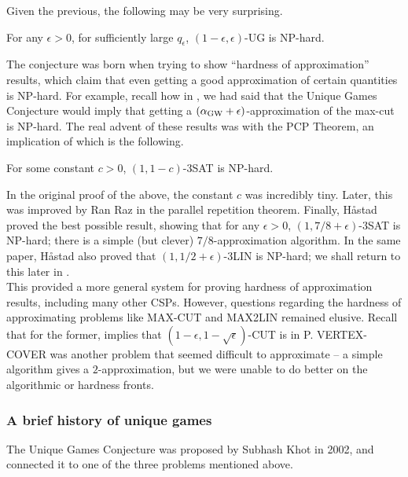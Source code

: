 		Given the previous, the following may be very surprising.
		\begin{fcon}
			For any $\epsilon > 0$, for sufficiently large $q_{\epsilon}$, $(1-\epsilon,\epsilon)$-UG is \textsf{NP}-hard.
		\end{fcon}
		The conjecture was born when trying to show ``hardness of approximation'' results, which claim that even getting a good approximation of certain quantities is \textsf{NP}-hard. For example, recall how in , we had said that the Unique Games Conjecture would imply that getting a $(\alpha_{\text{GW}}+\epsilon)$-approximation of the max-cut is \textsf{NP}-hard. The real advent of these results was with the PCP Theorem, an implication of which is the following.

		\begin{theorem}
			For some constant $c > 0$, $(1,1-c)$-3SAT is \textsf{NP}-hard.
		\end{theorem}
		In the original proof of the above, the constant $c$ was incredibly tiny. Later, this was improved by Ran Raz \cite{raz-parallel-reptn} in the parallel repetition theorem. Finally, H\r{a}stad \cite{hastad-appx-3sat} proved the best possible result, showing that for any $\epsilon > 0$, $(1,7/8 + \epsilon)$-3SAT is \textsf{NP}-hard; there is a simple (but clever) $7/8$-approximation algorithm. In the same paper, H\r{a}stad also proved that $(1,1/2+\epsilon)$-3LIN is \textsf{NP}-hard; we shall return to this later in .\\
		This provided a more general system for proving hardness of approximation results, including many other CSPs. However, questions regarding the hardness of approximating problems like MAX-CUT and MAX2LIN remained elusive. Recall that for the former,  implies that $(1-\epsilon,1-\sqrt{\epsilon})$-CUT is in \textsf{P}. VERTEX-COVER was another problem that seemed difficult to approximate -- a simple algorithm gives a $2$-approximation, but we were unable to do better on the algorithmic or hardness fronts.

	\subsubsection{A brief history of unique games}

		The Unique Games Conjecture was proposed by Subhash Khot \cite{ugc-og} in 2002, and connected it to one of the three problems mentioned above.

